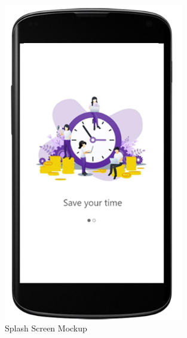 \begin{figure}[H]
  \centering
  \includegraphics[width=0.7\textwidth,keepaspectratio]{images/3.jpg}
  \caption{Splash Screen Mockup}
\end{figure}
